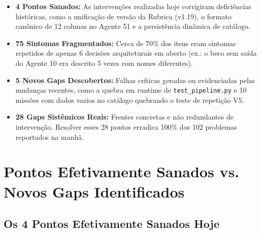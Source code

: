 \documentclass[11pt,a4paper]{article}
\begin{document}
\begin{itemize}[leftmargin=1.5em]
    \item \textbf{4 Pontos Sanados:} As intervenções realizadas hoje corrigiram deficiências históricas, como a unificação de versão da Rubrica (v1.19), o formato canônico de 12 colunas no Agente 51 e a persistência dinâmica de catálogo.
    \item \textbf{75 Sintomas Fragmentados:} Cerca de 70\% dos itens eram sintomas repetidos de apenas 6 decisões arquiteturais em aberto (ex.: o beco sem saída do Agente 10 era descrito 5 vezes com nomes diferentes).
    \item \textbf{5 Novos Gaps Descobertos:} Falhas críticas geradas ou evidenciadas pelas mudanças recentes, como a quebra em runtime de \texttt{test\_pipeline.py} e 10 missões com dados vazios no catálogo quebrando o teste de repetição V5.
    \item \textbf{28 Gaps Sistêmicos Reais:} Frentes concretas e não redundantes de intervenção. Resolver esses 28 pontos erradica 100\% dos 102 problemas reportados na manhã.
\end{itemize}

\section{Pontos Efetivamente Sanados vs. Novos Gaps Identificados}

\subsection{Os 4 Pontos Efetivamente Sanados Hoje}
\end{document}
